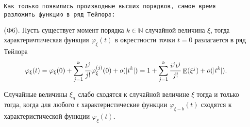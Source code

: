 \texttt{Как только появились производные высших порядков, самое время разложить функцию в ряд Тейлора:} 

(Ф6). Пусть существует момент порядка $k \in \mathbb{N}$ случайной величина $\xi$, тогда характеричтическая функция $\varphi_\xi (t)$ в окрестности точки $t = 0$ разлагается в ряд Тейлора
\begin{equation*}
    \varphi_\xi (t) = \varphi_\xi (0) + \sum_{j=1}^{k} \frac{t^j}{j!} \varphi_\xi^{(j)} (0) + o(|t^k|) 
    = 
    1 + \sum_{j=1}^{k} \frac{i^j t^j}{j!} \mathop{\mathrm{E}}\nolimits (\xi^j) + o(|t^k|).
\end{equation*}

\begin{to_thr}
    Случайные величины $\xi_n$ слабо сходятся к случайной величине $\xi$ тогда и только тогда, когда для любого $t$ характеристические функции $\varphi_{\xi-b} (t)$ сходятся к  характеристической функции $\varphi_\xi (t)$. 
\end{to_thr}